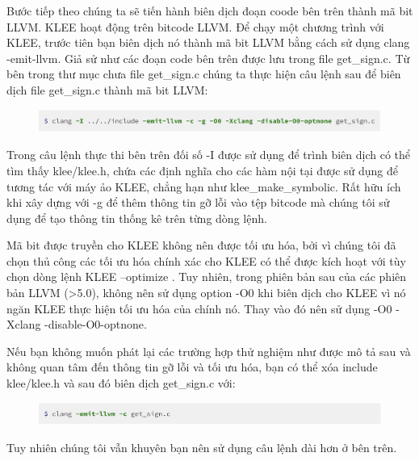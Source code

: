 \documentclass[12pt,a4paper]{article}
\begin{document}
Bước tiếp theo chúng ta sẽ tiến hành biên dịch đoạn coode bên trên thành mã bit LLVM. KLEE hoạt động trên bitcode LLVM. Để chạy một chương trình với KLEE, trước tiên bạn biên dịch nó thành mã bit LLVM bằng cách sử dụng clang -emit-llvm. Giả sử như các đoạn code bên trên được lưu trong file get\_sign.c. Từ bên trong thư mục chưa file get\_sign.c chúng ta thực hiện câu lệnh sau để biên dịch file get\_sign.c thành mã bit LLVM:

\begin{figure}[ht]
\begin{center}
\includegraphics[scale=.3]{hinhanh/clangcompiling.png}
\end{center}
\end{figure}

Trong câu lệnh thực thi bên trên đối số -I được sử dụng để trình biên dịch có thể tìm thấy klee/klee.h, chứa các định nghĩa cho các hàm nội tại được sử dụng để tương tác với máy ảo KLEE, chẳng hạn như klee\_make\_symbolic. Rất hữu ích khi xây dựng với -g để thêm thông tin gỡ lỗi vào tệp bitcode mà chúng tôi sử dụng để tạo thông tin thống kê trên từng dòng lệnh.

Mã bit được truyền cho KLEE không nên được tối ưu hóa, bởi vì chúng tôi đã chọn thủ công các tối ưu hóa chính xác cho KLEE có thể được kích hoạt với tùy chọn dòng lệnh KLEE --optimize . Tuy nhiên, trong phiên bản sau của các phiên bản LLVM (>5.0), không nên sử dụng option -O0 khi biên dịch cho KLEE vì nó ngăn KLEE thực hiện tối ưu hóa của chính nó. Thay vào đó nên sử dụng -O0 -Xclang -disable-O0-optnone.

Nếu bạn không muốn phát lại các trường hợp thử nghiệm như được mô tả sau và không quan tâm đến thông tin gỡ lỗi và tối ưu hóa, bạn có thể xóa include klee/klee.h và sau đó biên dịch get\_sign.c với:

\begin{figure}[ht]
\begin{center}
\includegraphics[scale=.3]{hinhanh/clangCompilingshort.png}
\end{center}
\end{figure}

Tuy nhiên chúng tôi vẫn khuyên bạn nên sử dụng câu lệnh dài hơn ở bên trên.
\end{document}
